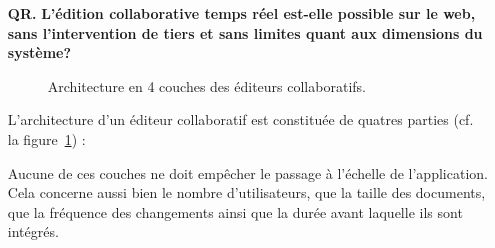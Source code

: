\begin{itemize}
\item [\textbf{QR.}] \textbf{L'édition collaborative temps réel est-elle
    possible sur le web, sans l'intervention de tiers et sans limites quant aux
    dimensions du système?}

\begin{figure}
  \begin{center}
    
    \caption[Architecture des éditeurs collaboratifs]
    {\label{intro:fig:architecture} Architecture en 4 couches des éditeurs
      collaboratifs.}
  \end{center}
\end{figure}

L'architecture d'un éditeur collaboratif est constituée de quatres parties
(cf. la figure~\ref{intro:fig:architecture}) :

Aucune de ces couches ne doit empêcher le passage à l'échelle de l'application.
Cela concerne aussi bien le nombre d'utilisateurs, que la taille des documents,
que la fréquence des changements ainsi que la durée avant laquelle ils sont
intégrés.

  


\end{itemize}
